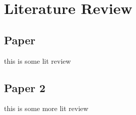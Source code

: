 \chapter{Literature Review}

\section{Paper}
this is some lit review

\section{Paper 2}
this is some more lit review